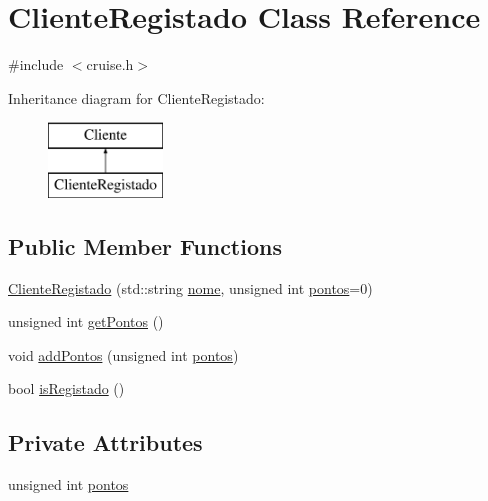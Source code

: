 \hypertarget{classClienteRegistado}{}\section{Cliente\+Registado Class Reference}
\label{classClienteRegistado}


{\ttfamily \#include $<$cruise.\+h$>$}

Inheritance diagram for Cliente\+Registado\+:\begin{figure}[H]
\begin{center}
\leavevmode
\includegraphics[height=2.000000cm]{classClienteRegistado}
\end{center}
\end{figure}
\subsection*{Public Member Functions}
\begin{DoxyCompactItemize}
\item 
\hyperlink{classClienteRegistado_a27df6b812a22aa40e43968b4cfc7eec6}{Cliente\+Registado} (std\+::string \hyperlink{classCliente_aaa79b0a26f7d5d007fe4ae9696564ca5}{nome}, unsigned int \hyperlink{classClienteRegistado_a137b6b72d824b38eabcfcb78671dd495}{pontos}=0)
\item 
unsigned int \hyperlink{classClienteRegistado_a0118e31f16e4dce542f5e1d124d26c61}{get\+Pontos} ()
\item 
void \hyperlink{classClienteRegistado_a0148a97dd713addd6a932f282e076ba3}{add\+Pontos} (unsigned int \hyperlink{classClienteRegistado_a137b6b72d824b38eabcfcb78671dd495}{pontos})
\item 
bool \hyperlink{classClienteRegistado_a3dade20423acb0e84c9fbe30c75f0e3e}{is\+Registado} ()
\end{DoxyCompactItemize}
\subsection*{Private Attributes}
\begin{DoxyCompactItemize}
\item 
unsigned int \hyperlink{classClienteRegistado_a137b6b72d824b38eabcfcb78671dd495}{pontos}
\end{DoxyCompactItemize}
